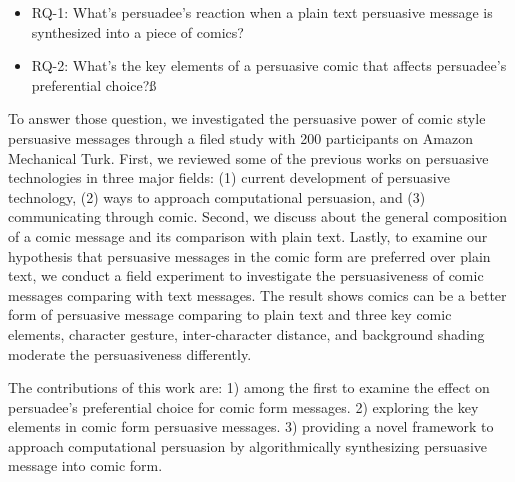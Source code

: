 \begin{itemize}
    \item RQ-1: What's persuadee's reaction when a plain text persuasive message is synthesized into a piece of comics?
    \item RQ-2: What's the key elements of a persuasive comic that affects persuadee's preferential choice?ß
\end{itemize}
To answer those question, we investigated the persuasive power of comic style persuasive messages through a filed study with 200 participants on Amazon Mechanical Turk. First, we reviewed some of the previous works on persuasive technologies in three major fields: (1) current development of persuasive technology, (2) ways to approach computational persuasion, and (3) communicating through comic. Second, we discuss about the general composition of a comic message and its comparison with plain text. Lastly, to examine our hypothesis that persuasive messages in the comic form are preferred over plain text, we conduct a field experiment to investigate the persuasiveness of comic messages comparing with text messages. The result shows comics can be a better form of persuasive message comparing to plain text and three key comic elements, character gesture, inter-character distance, and background shading moderate the persuasiveness differently.\par

The contributions of this work are: 1) among the first to examine the effect on persuadee's preferential choice for comic form messages. 2) exploring the key elements in comic form persuasive messages. 3) providing a novel framework to approach computational persuasion by algorithmically synthesizing persuasive message into comic form. \par
